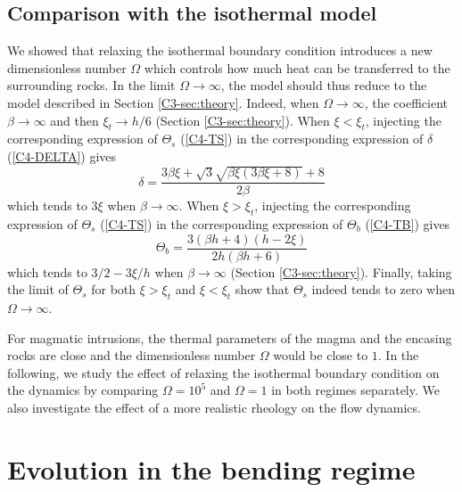 \subsection{Comparison with the isothermal model}
\label{C4-sec:some-limits}

We showed that relaxing the isothermal boundary condition introduces a
new dimensionless number $\Omega$ which  controls how much heat can be
transferred    to   the    surrounding    rocks.     In   the    limit
$\Omega \rightarrow \infty$, the model should thus reduce to the model
described    in    Section    \ref{C3-sec:theory}.     Indeed,    when
$\Omega\rightarrow \infty$, the  coefficient $\beta\rightarrow \infty$
and then  $\xi_t\rightarrow h/6$ (Section  \ref{C3-sec:theory}).  When
$\xi<\xi_t$,  injecting  the  corresponding expression  of  $\Theta_s$
(\ref{C4-TS})   in   the    corresponding   expression   of   $\delta$
(\ref{C4-DELTA}) gives
\begin{equation}
  \delta =\frac{3 \beta \xi +\sqrt{3} \sqrt{\beta \xi (3 \beta \xi +8)}+8}{2 \beta }
\end{equation}
which  tends   to  $3\xi$  when  $\beta   \rightarrow  \infty$.   When
$\xi>\xi_t$,  injecting  the  corresponding expression  of  $\Theta_s$
(\ref{C4-TS})   in   the   corresponding  expression   of   $\Theta_b$
(\ref{C4-TB}) gives
\begin{equation}
  \Theta_b = \frac{3 (\beta  h+4) (h-2 \xi )}{2 h (\beta  h+6)}
\end{equation}
which tends  to $3/2-3\xi/h$ when $\beta  \rightarrow \infty$ (Section
\ref{C3-sec:theory}). Finally, taking the limit of $\Theta_s$ for both
$\xi>\xi_t$ and $\xi<\xi_t$ show that  $\Theta_s$ indeed tends to zero
when $\Omega\rightarrow \infty$.

For magmatic intrusions,  the thermal parameters of the  magma and the
encasing rocks are  close and the dimensionless  number $\Omega$ would
be close to $1$. In the following, we study the effect of relaxing the
isothermal   boundary  condition   on   the   dynamics  by   comparing
$\Omega=10^5$ and  $\Omega = 1$  in both regimes separately.   We also
investigate  the effect  of  a  more realistic  rheology  on the  flow
dynamics.

\section{Evolution in the bending regime}
\label{C4-sec:evol-bend-regime-1}

